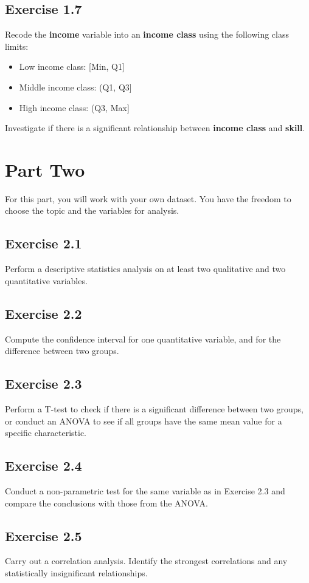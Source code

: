 \documentclass[a4paper,12pt]{article}
\begin{document}
\subsection*{Exercise 1.7}
Recode the \textbf{income} variable into an \textbf{income class} using the following class limits: 
\begin{itemize}
    \item Low income class: [Min, Q1]
    \item Middle income class: (Q1, Q3]
    \item High income class: (Q3, Max]
\end{itemize}
Investigate if there is a significant relationship between \textbf{income class} and \textbf{skill}.

\newpage

\section*{Part Two}
For this part, you will work with your own dataset. You have the freedom to choose the topic and the variables for analysis.

\subsection*{Exercise 2.1}
Perform a descriptive statistics analysis on at least two qualitative and two quantitative variables.

\subsection*{Exercise 2.2}
Compute the confidence interval for one quantitative variable, and for the difference between two groups.

\subsection*{Exercise 2.3}
Perform a T-test to check if there is a significant difference between two groups, or conduct an ANOVA to see if all groups have the same mean value for a specific characteristic.

\subsection*{Exercise 2.4}
Conduct a non-parametric test for the same variable as in Exercise 2.3 and compare the conclusions with those from the ANOVA.

\subsection*{Exercise 2.5}
Carry out a correlation analysis. Identify the strongest correlations and any statistically insignificant relationships.
\end{document}
